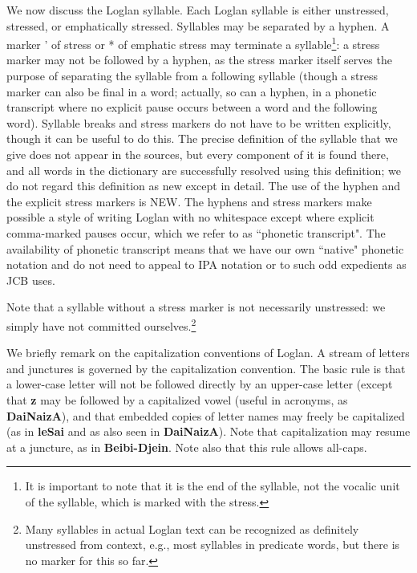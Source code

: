 \documentclass[12pt]{book}
\begin{document}
We now discuss the Loglan syllable.  Each Loglan syllable is either unstressed, stressed, or emphatically stressed.  Syllables may be separated by a hyphen.
A marker ' of stress or * of emphatic stress may terminate a syllable\footnote{It is important to note that it is the end of the syllable, not the vocalic unit of the syllable, which is marked with the stress.}:  a stress marker may not be followed by a hyphen, as the stress marker itself serves the purpose of separating the syllable from a following syllable (though a stress marker can also be final in a word; actually, so can a hyphen, in a phonetic transcript where no explicit pause occurs between a word and the following word).  Syllable breaks and stress markers do not have to be written explicitly, though it can be useful to do this.  The precise definition of the syllable that we give does not appear in the sources, but every component of it is found there, and all words in the dictionary are successfully resolved using this definition;  we do not regard this definition as new except in detail.  The use of the hyphen and the explicit stress markers is NEW.  The hyphens and stress markers make possible a style of writing Loglan with no whitespace except where explicit comma-marked pauses occur, which we refer to as ``phonetic transcript".  The availability of phonetic transcript means that we have our own ``native" phonetic notation and do not need to appeal to IPA notation or to such odd expedients as JCB uses.

Note that a syllable without a stress marker is not necessarily unstressed:  we simply have not committed ourselves.\footnote{Many syllables in actual Loglan text can be recognized as definitely unstressed from context, e.g., most syllables in predicate words, but there is no marker for this so far.}

We briefly remark on the capitalization conventions of Loglan.  A stream of letters and junctures is governed by the capitalization convention.  The basic rule is that a lower-case letter will not be followed directly by an upper-case letter (except that {\bf z} may be followed by a capitalized vowel (useful in acronyms, as {\bf DaiNaizA}), and that embedded copies of letter names may freely be capitalized (as in {\bf leSai} and as also seen in {\bf DaiNaizA}).  Note that capitalization may resume at a juncture, as in {\bf Beibi-Djein}.  Note also that this rule allows all-caps.
\end{document}
